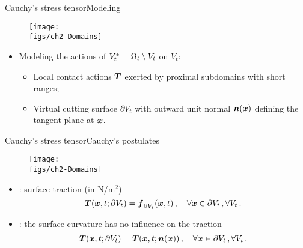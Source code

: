 \begin{frame}{Cauchy's stress tensor}{Modeling}

\begin{figure}
\centering\texttt{[image: \\figs/ch2-Domains]}
\end{figure}
\begin{itemize}
\item Modeling the actions of $V_t^*=\Omega_t\setminus V_t$ on $V_t$:
\begin{itemize}
\item Local contact actions ${\boldsymbol{T}}$ exerted by proximal subdomains with short ranges;
\item Virtual cutting surface $\partial V_t$ with outward unit normal ${\boldsymbol{n}}({\boldsymbol{x}})$ defining the tangent plane at ${\boldsymbol{x}}$.
\end{itemize}
\end{itemize}

\end{frame}

\begin{frame}{Cauchy's stress tensor}{Cauchy's postulates}

\begin{figure}
\centering\texttt{[image: \\figs/ch2-Domains]}
\end{figure}
\begin{itemize}
\item{}: surface traction (in N/m$^2$)
\begin{displaymath}
{\boldsymbol{T}}({\boldsymbol{x}},t;\partial V_t)={\boldsymbol{f}}_{\partial V_t}({\boldsymbol{x}},t)\,,\quad\forall{\boldsymbol{x}}\in\partial V_t\,,\forall V_t\,.
\end{displaymath}
\item{}: the surface curvature has no influence on the traction
\begin{displaymath}
{\boldsymbol{T}}({\boldsymbol{x}},t;\partial V_t)={\boldsymbol{T}}({\boldsymbol{x}},t;{\boldsymbol{n}}({\boldsymbol{x}}))\,,\quad\forall{\boldsymbol{x}}\in\partial V_t\,,\forall V_t\,.
\end{displaymath}
\end{itemize}

\end{frame}

